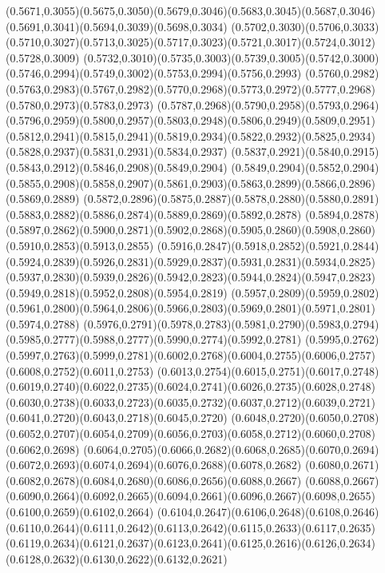 (0.5671,0.3055)(0.5675,0.3050)(0.5679,0.3046)(0.5683,0.3045)(0.5687,0.3046)(0.5691,0.3041)(0.5694,0.3039)(0.5698,0.3034)
(0.5702,0.3030)(0.5706,0.3033)(0.5710,0.3027)(0.5713,0.3025)(0.5717,0.3023)(0.5721,0.3017)(0.5724,0.3012)(0.5728,0.3009)
(0.5732,0.3010)(0.5735,0.3003)(0.5739,0.3005)(0.5742,0.3000)(0.5746,0.2994)(0.5749,0.3002)(0.5753,0.2994)(0.5756,0.2993)
(0.5760,0.2982)(0.5763,0.2983)(0.5767,0.2982)(0.5770,0.2968)(0.5773,0.2972)(0.5777,0.2968)(0.5780,0.2973)(0.5783,0.2973)
(0.5787,0.2968)(0.5790,0.2958)(0.5793,0.2964)(0.5796,0.2959)(0.5800,0.2957)(0.5803,0.2948)(0.5806,0.2949)(0.5809,0.2951)
(0.5812,0.2941)(0.5815,0.2941)(0.5819,0.2934)(0.5822,0.2932)(0.5825,0.2934)(0.5828,0.2937)(0.5831,0.2931)(0.5834,0.2937)
(0.5837,0.2921)(0.5840,0.2915)(0.5843,0.2912)(0.5846,0.2908)(0.5849,0.2904)
\PST@Solid(0.5849,0.2904)(0.5852,0.2904)(0.5855,0.2908)(0.5858,0.2907)(0.5861,0.2903)(0.5863,0.2899)(0.5866,0.2896)(0.5869,0.2889)
(0.5872,0.2896)(0.5875,0.2887)(0.5878,0.2880)(0.5880,0.2891)(0.5883,0.2882)(0.5886,0.2874)(0.5889,0.2869)(0.5892,0.2878)
(0.5894,0.2878)(0.5897,0.2862)(0.5900,0.2871)(0.5902,0.2868)(0.5905,0.2860)(0.5908,0.2860)(0.5910,0.2853)(0.5913,0.2855)
(0.5916,0.2847)(0.5918,0.2852)(0.5921,0.2844)(0.5924,0.2839)(0.5926,0.2831)(0.5929,0.2837)(0.5931,0.2831)(0.5934,0.2825)
(0.5937,0.2830)(0.5939,0.2826)(0.5942,0.2823)(0.5944,0.2824)(0.5947,0.2823)(0.5949,0.2818)(0.5952,0.2808)(0.5954,0.2819)
(0.5957,0.2809)(0.5959,0.2802)(0.5961,0.2800)(0.5964,0.2806)(0.5966,0.2803)(0.5969,0.2801)(0.5971,0.2801)(0.5974,0.2788)
(0.5976,0.2791)(0.5978,0.2783)(0.5981,0.2790)(0.5983,0.2794)(0.5985,0.2777)(0.5988,0.2777)(0.5990,0.2774)(0.5992,0.2781)
(0.5995,0.2762)(0.5997,0.2763)(0.5999,0.2781)(0.6002,0.2768)(0.6004,0.2755)(0.6006,0.2757)(0.6008,0.2752)(0.6011,0.2753)
(0.6013,0.2754)(0.6015,0.2751)(0.6017,0.2748)(0.6019,0.2740)(0.6022,0.2735)(0.6024,0.2741)(0.6026,0.2735)(0.6028,0.2748)
(0.6030,0.2738)(0.6033,0.2723)(0.6035,0.2732)(0.6037,0.2712)(0.6039,0.2721)(0.6041,0.2720)(0.6043,0.2718)(0.6045,0.2720)
(0.6048,0.2720)(0.6050,0.2708)(0.6052,0.2707)(0.6054,0.2709)(0.6056,0.2703)(0.6058,0.2712)(0.6060,0.2708)(0.6062,0.2698)
(0.6064,0.2705)(0.6066,0.2682)(0.6068,0.2685)(0.6070,0.2694)(0.6072,0.2693)(0.6074,0.2694)(0.6076,0.2688)(0.6078,0.2682)
(0.6080,0.2671)(0.6082,0.2678)(0.6084,0.2680)(0.6086,0.2656)(0.6088,0.2667)
\PST@Solid(0.6088,0.2667)(0.6090,0.2664)(0.6092,0.2665)(0.6094,0.2661)(0.6096,0.2667)(0.6098,0.2655)(0.6100,0.2659)(0.6102,0.2664)
(0.6104,0.2647)(0.6106,0.2648)(0.6108,0.2646)(0.6110,0.2644)(0.6111,0.2642)(0.6113,0.2642)(0.6115,0.2633)(0.6117,0.2635)
(0.6119,0.2634)(0.6121,0.2637)(0.6123,0.2641)(0.6125,0.2616)(0.6126,0.2634)(0.6128,0.2632)(0.6130,0.2622)(0.6132,0.2621)
